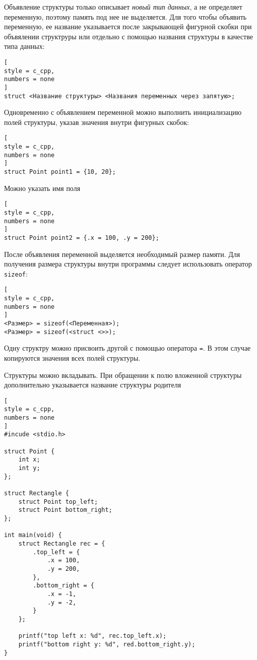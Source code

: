 \documentclass[%
	11pt,
	a4paper,
	utf8,
		]{article}
\begin{document}
Объявление структуры только описывает \emph{новый тип данных}, а не определяет переменную, поэтому память под нее не выделяется. Для того чтобы объявить переменную, ее название указывается после закрывающей фигурной скобки при объвялении структруры или отдельно с помощью названия структуры в качестве типа данных:
\begin{lstlisting}[
style = c_cpp,
numbers = none
]
struct <Название структуры> <Названия переменных через запятую>;
\end{lstlisting}

Одновременно с объявлением переменной можно выполнить инициализацию полей структуры, указав значения внутри фигурных скобок:
\begin{lstlisting}[
style = c_cpp,
numbers = none
]
struct Point point1 = {10, 20};
\end{lstlisting}

Можно указать имя поля
\begin{lstlisting}[
style = c_cpp,
numbers = none
]
struct Point point2 = {.x = 100, .y = 200};
\end{lstlisting}

После объявления переменной выделяется необходимый размер памяти. Для получения размера структуры внутри программы следует использовать оператор \verb*|sizeof|:
\begin{lstlisting}[
style = c_cpp,
numbers = none
]
<Размер> = sizeof(<Переменная>);
<Размер> = sizeof(<struct <>>);
\end{lstlisting}

Одну структру можно присвоить другой с помощью оператора \verb|=|. В этом случае копируются значения всех полей структуры.

Структуры можно вкладывать. При обращении к полю вложенной структуры дополнительно указывается название структуры родителя
\begin{lstlisting}[
style = c_cpp,
numbers = none
]
#incude <stdio.h>

struct Point {
    int x;
    int y;
};

struct Rectangle {
    struct Point top_left;
    struct Point bottom_right;
};

int main(void) {
    struct Rectangle rec = {
        .top_left = {
            .x = 100,
            .y = 200,
        },
        .bottom_right = {
            .x = -1,
            .y = -2,
        }
    };
    
    printf("top left x: %d", rec.top_left.x);
    printf("bottom right y: %d", red.bottom_right.y);
}
\end{lstlisting}
\end{document}
